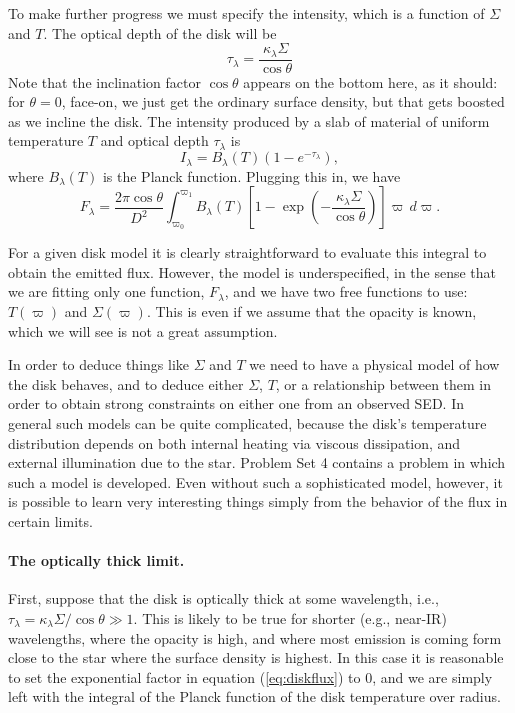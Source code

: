 To make further progress we must specify the intensity, which is a function of $\Sigma$ and $T$. The optical depth of the disk will be
\begin{equation}
\tau_{\lambda} = \frac{\kappa_{\lambda}\Sigma}{\cos\theta}
\end{equation}
Note that the inclination factor $\cos\theta$ appears on the bottom here, as it should: for $\theta=0$, face-on, we just get the ordinary surface density, but that gets boosted as we incline the disk. The intensity produced by a slab of material of uniform temperature $T$ and optical depth $\tau_{\lambda}$ is
\begin{equation}
I_{\lambda} = B_{\lambda}(T) \left(1-e^{-\tau_{\lambda}}\right),
\end{equation}
where $B_{\lambda}(T)$ is the Planck function. Plugging this in, we have
\begin{equation}
\label{eq:diskflux}
F_{\lambda} = \frac{2\pi \cos\theta}{D^2} \int_{\varpi_0}^{\varpi_1} B_{\lambda}(T) \left[1-\exp\left(-\frac{\kappa_{\lambda}\Sigma}{\cos\theta}\right)\right] \varpi\, d\varpi.
\end{equation}

For a given disk model it is clearly straightforward to evaluate this integral to obtain the emitted flux. However, the model is underspecified, in the sense that we are fitting only one function, $F_{\lambda}$, and we have two free functions to use: $T(\varpi)$ and $\Sigma(\varpi)$. This is even if we assume that the opacity is known, which we will see is not a great assumption.

In order to deduce things like $\Sigma$ and $T$ we need to have a physical model of how the disk behaves, and to deduce either $\Sigma$, $T$, or a relationship between them in order to obtain strong constraints on either one from an observed SED. In general such models can be quite complicated, because the disk's temperature distribution depends on both internal heating via viscous dissipation, and external illumination due to the star. Problem Set 4 contains a problem in which such a model is developed. Even without such a sophisticated model, however, it is possible to learn very interesting things simply from the behavior of the flux in certain limits.

\paragraph{The optically thick limit.}

First, suppose that the disk is optically thick at some wavelength, i.e., $\tau_{\lambda} = \kappa_{\lambda}\Sigma/\cos\theta \gg 1$. This is likely to be true for shorter (e.g., near-IR) wavelengths, where the opacity is high, and where most emission is coming form close to the star where the surface density is highest. In this case it is reasonable to set the exponential factor in equation (\ref{eq:diskflux}) to 0, and we are simply left with the integral of the Planck function of the disk temperature over radius.

